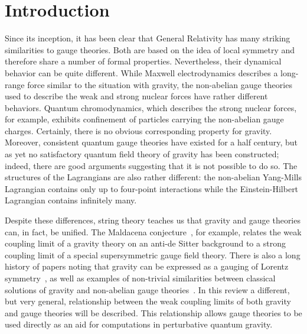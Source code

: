 \documentclass[12pt]{livrev}
\begin{document}
\section{Introduction}
\label{section:Introduction}

Since its inception, it has been clear that General Relativity has
many striking similarities to gauge theories.  Both are based on the
idea of local symmetry and therefore share a number of formal
properties.  Nevertheless, their dynamical behavior can be quite
different.  While Maxwell electrodynamics describes a long-range force
similar to the situation with gravity, the non-abelian gauge theories
used to describe the weak and strong nuclear forces have rather
different behaviors.  Quantum chromodynamics, which describes the
strong nuclear forces, for example, exhibits confinement of particles
carrying the non-abelian gauge charges. Certainly, there is no obvious
corresponding property for gravity.  Moreover, consistent quantum
gauge theories have existed for a half century, but as yet no
satisfactory quantum field theory of gravity has been constructed;
indeed, there are good arguments suggesting that it is not possible to
do so.  The structures of the Lagrangians are also rather different:
the non-abelian Yang-Mills Lagrangian contains only up to four-point
interactions while the Einstein-Hilbert Lagrangian contains infinitely
many.

Despite these differences, string theory teaches us that gravity and
gauge theories can, in fact, be unified.  The Maldacena
conjecture~\cite{Maldacena98,Aharony00}, for example, relates the weak
coupling limit of a gravity theory on an anti-de Sitter background to
a strong coupling limit of a special supersymmetric gauge field
theory.  There is also a long history of papers noting that gravity
can be expressed as a gauging of Lorentz
symmetry~\cite{Utiyama56,Ivanenko83,Hehl95}, as well as examples
of non-trivial similarities between classical solutions of gravity and
non-abelian gauge theories~\cite{Singleton99}.
In this review a different, but very general, relationship between the
weak coupling limits of both gravity and gauge theories will be
described.  This relationship allows gauge theories to be used
directly as an aid for computations in perturbative quantum gravity.
\end{document}
